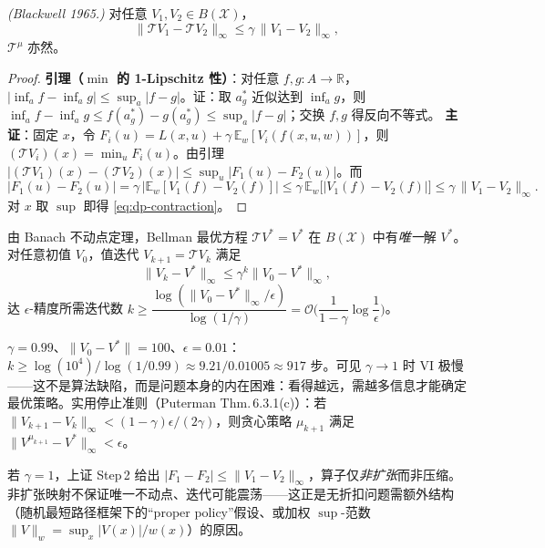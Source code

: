\begin{theorem}[$\gamma$-压缩]\label{thm:dp-contraction}
\emph{(Blackwell 1965\cite{blackwell1965discounted}.)} 对任意 $V_1,V_2\in B(\mathcal X)$，
\begin{equation}
  \|\mathcal TV_1-\mathcal TV_2\|_\infty\le\gamma\,\|V_1-V_2\|_\infty,
  \label{eq:dp-contraction}
\end{equation}
$\mathcal T^\mu$ 亦然。
\end{theorem}

\begin{proof}
\textbf{引理（$\min$ 的 1-Lipschitz 性）}：对任意 $f,g:A\to\mathbb R$，$|\inf_a f-\inf_a g|\le\sup_a|f-g|$。证：取 $a_g^*$ 近似达到 $\inf_a g$，则 $\inf_a f-\inf_a g\le f(a_g^*)-g(a_g^*)\le\sup_a|f-g|$；交换 $f,g$ 得反向不等式。
\textbf{主证}：固定 $x$，令 $F_i(u)=L(x,u)+\gamma\,\mathbb E_w[V_i(f(x,u,w))]$，则 $(\mathcal TV_i)(x)=\min_u F_i(u)$。由引理 $|(\mathcal TV_1)(x)-(\mathcal TV_2)(x)|\le\sup_u|F_1(u)-F_2(u)|$。而
\[
|F_1(u)-F_2(u)|=\gamma\,\big|\mathbb E_w[V_1(f)-V_2(f)]\big|\le\gamma\,\mathbb E_w\big[|V_1(f)-V_2(f)|\big]\le\gamma\,\|V_1-V_2\|_\infty.
\]
对 $x$ 取 $\sup$ 即得 \cref{eq:dp-contraction}。
\end{proof}

\begin{corollary}\label{cor:dp-banach}
由 Banach 不动点定理，Bellman 最优方程 $\mathcal TV^*=V^*$ 在 $B(\mathcal X)$ 中有\emph{唯一}解 $V^*$。对任意初值 $V_0$，值迭代 $V_{k+1}=\mathcal TV_k$ 满足
\begin{equation}
  \|V_k-V^*\|_\infty\le\gamma^k\|V_0-V^*\|_\infty,
  \label{eq:dp-vi-rate}
\end{equation}
达 $\epsilon$-精度所需迭代数 $k\ge\dfrac{\log(\|V_0-V^*\|_\infty/\epsilon)}{\log(1/\gamma)}=\mathcal O\!\Big(\dfrac1{1-\gamma}\log\dfrac1\epsilon\Big)$。
\end{corollary}

\begin{example}[迭代数的量级]
$\gamma=0.99$、$\|V_0-V^*\|=100$、$\epsilon=0.01$：$k\ge\log(10^4)/\log(1/0.99)\approx9.21/0.01005\approx917$ 步。可见 $\gamma\to1$ 时 VI 极慢——这不是算法缺陷，而是问题本身的内在困难：看得越远，需越多信息才能确定最优策略。实用停止准则（Puterman Thm.\,6.3.1(c)\cite{puterman1994mdp}）：若 $\|V_{k+1}-V_k\|_\infty<(1-\gamma)\epsilon/(2\gamma)$，则贪心策略 $\mu_{k+1}$ 满足 $\|V^{\mu_{k+1}}-V^*\|_\infty<\epsilon$。
\end{example}

\begin{remark}[$\gamma=1$ 的退化]
若 $\gamma=1$，上证 Step\,2 给出 $|F_1-F_2|\le\|V_1-V_2\|_\infty$，算子仅\emph{非扩张}而非压缩。非扩张映射不保证唯一不动点、迭代可能震荡——这正是无折扣问题需额外结构（随机最短路径框架下的“proper policy”假设、或加权 $\sup$-范数 $\|V\|_w=\sup_x|V(x)|/w(x)$）的原因。
\end{remark}

